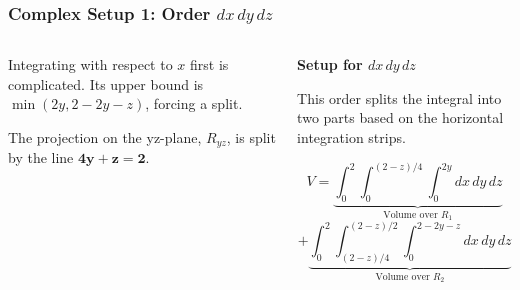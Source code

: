 \documentclass[aspectratio=169, UTF8]{beamer}
\begin{document}
\begin{frame}
\frametitle{Complex Setup 1: Order $dx\,dy\,dz$}

\begin{columns}[T]
    \begin{column}{0.5\textwidth}
        Integrating with respect to $x$ first is complicated. Its upper bound is $\min(2y, 2-2y-z)$, forcing a split.
        \vspace{1em}
        
        The projection on the yz-plane, $R_{yz}$, is split by the line $\mathbf{4y+z=2}$.
        
        \begin{center}
        \end{center}
        
    \end{column}
    
    \begin{column}{0.5\textwidth}
        \textbf{Setup for $dx\,dy\,dz$}
        \vspace{1em}
        
        This order splits the integral into two parts based on the horizontal integration strips.
        \vspace{1em}
        
        {\small
        $$ V = \underbrace{\int_0^2 \int_0^{(2-z)/4} \int_0^{2y} dx\,dy\,dz}_{\text{Volume over } R_1} $$
        $$ + \underbrace{\int_0^2 \int_{(2-z)/4}^{(2-z)/2} \int_0^{2-2y-z} dx\,dy\,dz}_{\text{Volume over } R_2} $$
        }
        
        
        
    \end{column}

\end{columns}

\end{frame}
\end{document}
